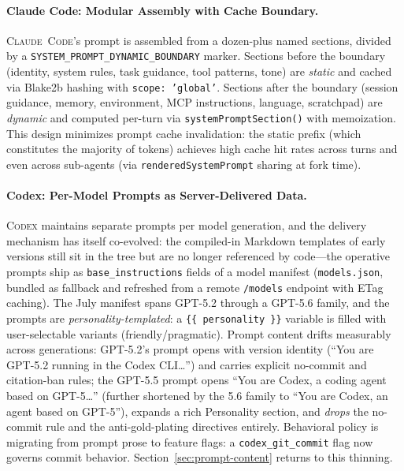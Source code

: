 \documentclass[11pt,a4paper]{article}
\newcommand{\clcode}{\textsc{Claude~Code}\xspace}
\newcommand{\cdx}{\textsc{Codex}\xspace}
\begin{document}
\paragraph{Claude Code: Modular Assembly with Cache Boundary.}
\clcode{}'s prompt is assembled from a dozen-plus named sections, divided by a \texttt{SYSTEM\_PROMPT\_DYNAMIC\_BOUNDARY} marker.
Sections before the boundary (identity, system rules, task guidance, tool patterns, tone) are \emph{static} and cached via Blake2b hashing with \texttt{scope: 'global'}.
Sections after the boundary (session guidance, memory, environment, MCP instructions, language, scratchpad) are \emph{dynamic} and computed per-turn via \texttt{systemPromptSection()} with memoization.
This design minimizes prompt cache invalidation: the static prefix (which constitutes the majority of tokens) achieves high cache hit rates across turns and even across sub-agents (via \texttt{renderedSystemPrompt} sharing at fork time).

\paragraph{Codex: Per-Model Prompts as Server-Delivered Data.}
\cdx{} maintains separate prompts per model generation, and the delivery mechanism has itself co-evolved: the compiled-in Markdown templates of early versions still sit in the tree but are no longer referenced by code---the operative prompts ship as \texttt{base\_instructions} fields of a model manifest (\texttt{models.json}, bundled as fallback and refreshed from a remote \texttt{/models} endpoint with ETag caching).
The July manifest spans GPT-5.2 through a GPT-5.6 family, and the prompts are \emph{personality-templated}: a \texttt{\{\{ personality \}\}} variable is filled with user-selectable variants (friendly/pragmatic).
Prompt content drifts measurably across generations: GPT-5.2's prompt opens with version identity (``You are GPT-5.2 running in the Codex CLI\ldots'') and carries explicit no-commit and citation-ban rules; the GPT-5.5 prompt opens ``You are Codex, a coding agent based on GPT-5\ldots'' (further shortened by the 5.6 family to ``You are Codex, an agent based on GPT-5''), expands a rich Personality section, and \emph{drops} the no-commit rule and the anti-gold-plating directives entirely. Behavioral policy is migrating from prompt prose to feature flags: a \texttt{codex\_git\_commit} flag now governs commit behavior.
Section~\ref{sec:prompt-content} returns to this thinning.
\end{document}
